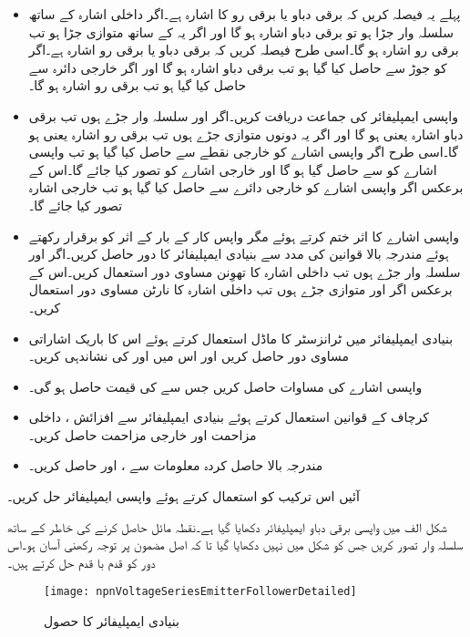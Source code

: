 \begin{itemize}
\item
پہلے یہ فیصلہ کریں کہ  برقی دباو یا برقی رو کا اشارہ ہے۔اگر  داخلی اشارہ  کے ساتھ سلسلہ وار جڑا ہو تو  برقی دباو اشارہ ہو گا اور اگر یہ  کے ساتھ متوازی جڑا ہو تب  برقی رو اشارہ ہو گا۔اسی طرح فیصلہ کریں کہ  برقی دباو یا برقی رو اشارہ ہے۔اگر  کو  جوڑ سے حاصل کیا گیا ہو تب  برقی دباو اشارہ ہو گا اور اگر  خارجی دائرہ سے حاصل کیا گیا ہو تب  برقی رو اشارہ ہو گا۔
\item
واپسی ایمپلیفائر کی جماعت دریافت کریں۔اگر  اور  سلسلہ وار جڑے ہوں تب  برقی دباو اشارہ یعنی  ہو گا اور اگر یہ دونوں متوازی جڑے ہوں تب  برقی رو اشارہ یعنی  ہو گا۔اسی طرح اگر واپسی اشارے کو خارجی نقطے  سے حاصل کیا گیا ہو تب واپسی اشارے کو  سے حاصل گیا ہو گا اور خارجی اشارے کو  تصور کیا جائے گا۔اس کے برعکس اگر واپسی اشارے کو خارجی دائرے سے حاصل کیا گیا ہو تب خارجی اشارہ  تصور کیا جائے گا۔
\item 
واپسی اشارے کا اثر ختم کرتے ہوئے مگر واپس کار کے بار کے اثر کو برقرار رکھتے ہوئے مندرجہ بالا قوانین کی مدد سے بنیادی ایمپلیفائر کا دور حاصل کریں۔اگر  اور  سلسلہ وار جڑے ہوں تب داخلی اشارہ  کا تھوِنن  مساوی دور استعمال کریں۔اس کے برعکس اگر  اور  متوازی جڑے ہوں تب داخلی اشارہ  کا نارٹن مساوی دور استعمال کریں۔
\item
بنیادی ایمپلیفائر میں ٹرانزسٹر کا ماڈل استعمال کرتے ہوئے اس کا باریک اشاراتی مساوی دور حاصل کریں اور اس میں  اور  کی نشاندہی کریں۔
\item
واپسی اشارے  کی مساوات حاصل کریں جس سے  کی قیمت حاصل ہو گی۔
\item
کرچاف کے قوانین استعمال کرتے ہوئے بنیادی ایمپلیفائر سے افزائش ، داخلی مزاحمت  اور خارجی مزاحمت  حاصل کریں۔
\item
مندرجہ بالا حاصل کردہ معلومات سے ،  اور  حاصل کریں۔
\end{itemize}

آئیں اس ترکیب کو استعمال کرتے ہوئے واپسی ایمپلیفائر حل کریں۔

شکل  الف میں واپسی برقی دباو ایمپلیفائر دکھایا گیا ہے۔نقطہ مائل حاصل کرنے کی خاطر  کے ساتھ  سلسلہ وار تصور کریں جس کو شکل میں نہیں دکھایا گیا تا کہ اصل مضمون پر توجہ رکھنی آسان ہو۔اس دور کو قدم با قدم حل کرتے ہیں۔
\begin{figure}
\centering
\texttt{[image: npnVoltageSeriesEmitterFollowerDetailed]}
\caption{بنیادی ایمپلیفائر کا حصول}
\label{شکل_واپسی_بنیادی_ایمپلیفائر_کا_حصول}
\end{figure}

